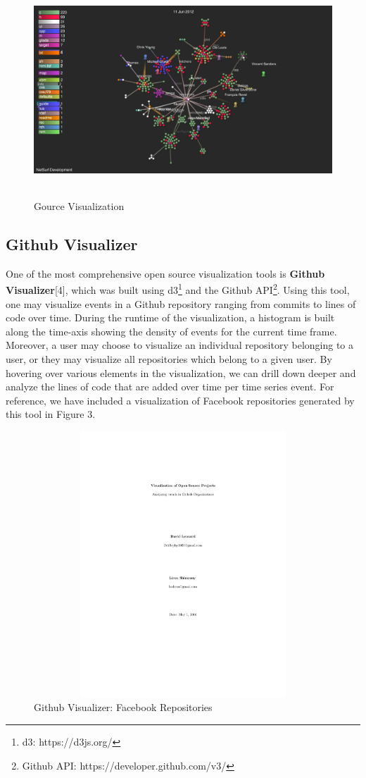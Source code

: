 \documentclass{article}
\begin{document}
\begin{figure}[h!]
\centering
\includegraphics[height=8cm, width=12cm]{gource}
\caption{Gource Visualization}
\end{figure}

\subsection {Github Visualizer}

One of the most comprehensive open source visualization tools is \textbf{Github Visualizer}[4], which was built using d3\footnote{d3: https://d3js.org/} and the Github API\footnote{Github API: https://developer.github.com/v3/}. Using this tool, one may visualize events in a Github repository ranging from commits to lines of code over time. During the runtime of the visualization, a histogram is built along the time-axis showing the density of events for the current time frame. Moreover, a user may choose to visualize an individual repository belonging to a user, or they may visualize all repositories which belong to a given user. By hovering over various elements in the visualization, we can drill down deeper and analyze the lines of code that are added over time per time series event. For reference, we have included a visualization of Facebook repositories generated by this tool in Figure 3.

\begin{figure}[h!]
\centering
\includegraphics[height=10cm, width=16cm]{viz}
\caption{Github Visualizer: Facebook Repositories}
\end{figure}
\end{document}
